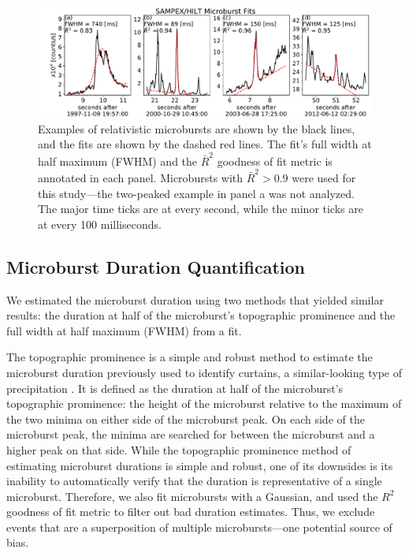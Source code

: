 \documentclass[draft]{agujournal2019}
\begin{document}
\begin{figure}
\noindent\includegraphics[width=\textwidth]{figures/fig1.pdf}
\caption{Examples of relativistic microbursts are shown by the black lines, and the fits are shown by the dashed red lines. The fit's full width at half maximum (FWHM) and the $\bar{R}^2$ goodness of fit metric is annotated in each panel. Microbursts with $\bar{R}^2 > 0.9$ were used for this study---the two-peaked example in panel a was not analyzed. The major time ticks are at every second, while the minor ticks are at every 100 milliseconds.}
\label{fig1}
\end{figure}

\subsection{Microburst Duration Quantification}
We estimated the microburst duration using two methods that yielded similar results: the duration at half of the microburst's topographic prominence and the full width at half maximum (FWHM) from a fit.

The topographic prominence is a simple and robust method to estimate the microburst duration previously used to identify curtains, a similar-looking type of precipitation \cite{Shumko2020b}. It is defined as the duration at half of the microburst's topographic prominence: the height of the microburst relative to the maximum of the two minima on either side of the microburst peak. On each side of the microburst peak, the minima are searched for between the microburst and a higher peak on that side. While the topographic prominence method of estimating microburst durations is simple and robust, one of its downsides is its inability to automatically verify that the duration is representative of a single microburst. Therefore, we also fit microbursts with a Gaussian, and used the $R^2$ goodness of fit metric to filter out bad duration estimates. Thus, we exclude events that are a superposition of multiple microbursts—one potential source of bias.
\end{document}
